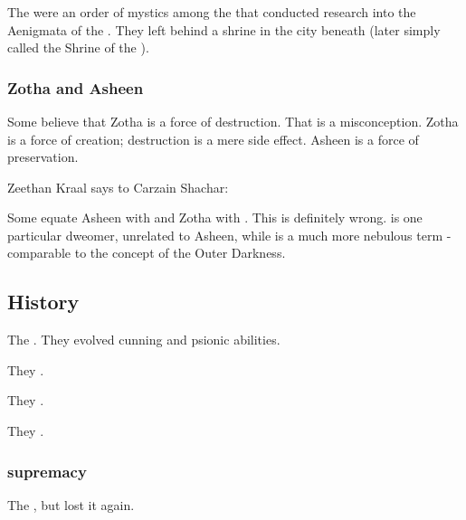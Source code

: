 \subsubsection{\UzulKaya}
The \UzulKaya were an order of mystics among the \ophidians that conducted research into the Aenigmata of the \xss. 
They left behind a shrine in the city beneath \Yormis (later simply called the Shrine of the \UzulKaya). 





\subsubsection{Zotha and Asheen}
%
%
Some believe that Zotha is a force of destruction. That is a misconception. Zotha is a force of creation; destruction is a mere side effect. Asheen is a force of preservation. 

Zeethan Kraal says to Carzain Shachar: 

Some equate Asheen with \Iquin and Zotha with \Itzach. This is definitely wrong. \Iquin is one particular dweomer, unrelated to Asheen, while \Itzach is a much more nebulous term - comparable to the \caisith concept of the Outer Darkness. 










\subsection{History}

The \ophidians{} . 
They evolved cunning and psionic abilities. 

They . 

They . 

They . 





\subsubsection{\QuilJaaran supremacy}
The \quiljaaran {}, but lost it again. 





